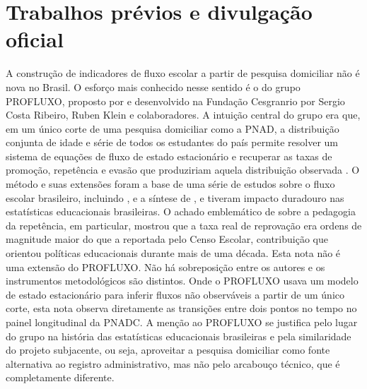 
\section{Trabalhos prévios e divulgação oficial}
\label{sec:tres_eras}

A construção de indicadores de fluxo escolar a partir de pesquisa
domiciliar não é nova no Brasil. O esforço mais conhecido nesse
sentido é o do grupo PROFLUXO, proposto por
\cite{Fletcher1985_modelo} e desenvolvido na Fundação Cesgranrio por
Sergio Costa Ribeiro, Ruben Klein e colaboradores. A intuição central
do grupo era que, em um único corte de uma pesquisa domiciliar como
a PNAD, a distribuição conjunta de idade e série de todos os
estudantes do país permite resolver um sistema de equações de fluxo
de estado estacionário e recuperar as taxas de promoção, repetência
e evasão que produziriam aquela distribuição observada
\citep{FletcherRibeiro1989_profluxo}. O método e suas extensões
foram a base de uma série de estudos sobre o fluxo escolar
brasileiro, incluindo \cite{KleinRibeiro1991_censo},
\cite{Fletcher1998_eficaz} e a síntese de \cite{Klein2006_educacao},
e tiveram impacto duradouro nas estatísticas educacionais
brasileiras. O achado emblemático de \cite{Ribeiro1991_pedagogia}
sobre a pedagogia da repetência, em particular, mostrou que a taxa
real de reprovação era ordens de magnitude maior do que a reportada
pelo Censo Escolar, contribuição que orientou políticas educacionais
durante mais de uma década. Esta nota não é uma extensão do
PROFLUXO. Não há sobreposição entre os autores e os instrumentos
metodológicos são distintos. Onde o PROFLUXO usava um modelo de
estado estacionário para inferir fluxos não observáveis a partir de
um único corte, esta nota observa diretamente as transições entre
dois pontos no tempo no painel longitudinal da PNADC. A menção ao
PROFLUXO se justifica pelo lugar do grupo na história das
estatísticas educacionais brasileiras e pela similaridade do
projeto subjacente, ou seja, aproveitar a pesquisa domiciliar como
fonte alternativa ao registro administrativo, mas não pelo arcabouço
técnico, que é completamente diferente.

